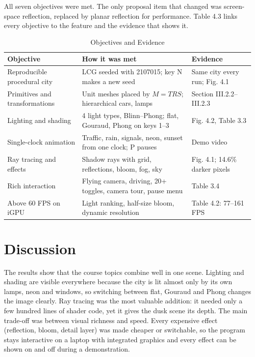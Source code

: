 \documentclass[12pt, a4paper]{report}
\begin{document}
\begin{justify}
  {\fontsize{12}{13.8}\selectfont
    All seven objectives were met. The only proposal item that changed was screen-space reflection, replaced by planar reflection for performance. Table 4.3 links every objective to the feature and the evidence that shows it.
  }
\end{justify}

\begin{table}[!htbp]
  \caption{Objectives and Evidence}
  \label{tab:4.3}
  \centering
  {\fontsize{10}{12.5}\selectfont
    \begin{tabular}{|p{1.7in}|p{2.2in}|p{1.5in}|}
      \hline
      \textbf{Objective} & \textbf{How it was met} & \textbf{Evidence} \\
      \hline
      Reproducible procedural city & LCG seeded with 2107015; key N makes a new seed & Same city every run; Fig. 4.1 \\
      \hline
      Primitives and transformations & Unit meshes placed by $M=TRS$; hierarchical cars, lamps & Section III.2.2--III.2.3 \\
      \hline
      Lighting and shading & 4 light types, Blinn--Phong; flat, Gouraud, Phong on keys 1--3 & Fig. 4.2, Table 3.3 \\
      \hline
      Single-clock animation & Traffic, rain, signals, neon, sunset from one clock; P pauses & Demo video \\
      \hline
      Ray tracing and effects & Shadow rays with grid, reflections, bloom, fog, sky & Fig. 4.1; 14.6\% darker pixels \\
      \hline
      Rich interaction & Flying camera, driving, 20+ toggles, camera tour, pause menu & Table 3.4 \\
      \hline
      Above 60 FPS on iGPU & Light ranking, half-size bloom, dynamic resolution & Table 4.2: 77--161 FPS \\
      \hline
    \end{tabular}
  }
\end{table}

\section{Discussion}

\begin{justify}
  {\fontsize{12}{13.8}\selectfont
    The results show that the course topics combine well in one scene. Lighting and shading are visible everywhere because the city is lit almost only by its own lamps, neon and windows, so switching between flat, Gouraud and Phong changes the image clearly. Ray tracing was the most valuable addition: it needed only a few hundred lines of shader code, yet it gives the dusk scene its depth. The main trade-off was between visual richness and speed. Every expensive effect (reflection, bloom, detail layer) was made cheaper or switchable, so the program stays interactive on a laptop with integrated graphics and every effect can be shown on and off during a demonstration.
  }
\end{justify}
\end{document}
